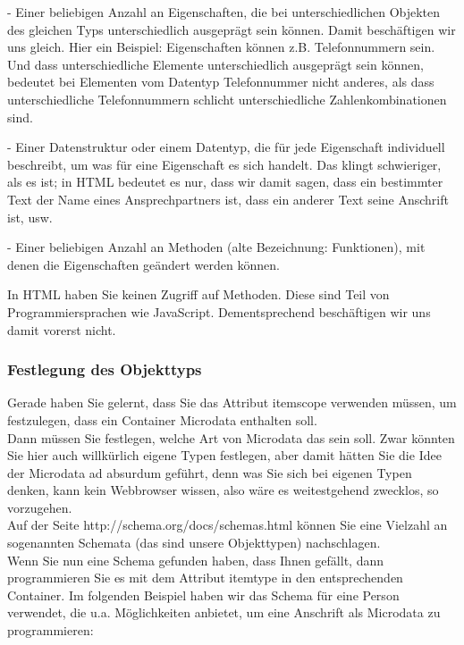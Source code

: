 -	Einer beliebigen Anzahl an Eigenschaften, die bei unterschiedlichen Objekten des gleichen Typs unterschiedlich ausgeprägt sein können.
Damit beschäftigen wir uns gleich. Hier ein Beispiel: Eigenschaften können z.B. Telefonnummern sein. Und dass unterschiedliche Elemente unterschiedlich ausgeprägt sein können, bedeutet bei Elementen vom Datentyp Telefonnummer nicht anderes, als dass unterschiedliche Telefonnummern schlicht unterschiedliche Zahlenkombinationen sind.

-	Einer Datenstruktur oder einem Datentyp, die für jede Eigenschaft individuell beschreibt, um was für eine Eigenschaft es sich handelt.
Das klingt schwieriger, als es ist; in HTML bedeutet es nur, dass wir damit sagen, dass ein bestimmter Text der Name eines Ansprechpartners ist, dass ein anderer Text seine Anschrift ist, usw.

-	Einer beliebigen Anzahl an Methoden (alte Bezeichnung: Funktionen), mit denen die Eigenschaften geändert werden können.

In HTML haben Sie keinen Zugriff auf Methoden. Diese sind Teil von Programmiersprachen wie JavaScript. Dementsprechend beschäftigen wir uns damit vorerst nicht.

\subsubsection{Festlegung des Objekttyps}

Gerade haben Sie gelernt, dass Sie das Attribut itemscope verwenden müssen, um festzulegen, dass ein Container Microdata enthalten soll.\\

Dann müssen Sie festlegen, welche Art von Microdata das sein soll. Zwar könnten Sie hier auch willkürlich eigene Typen festlegen, aber damit hätten Sie die Idee der Microdata ad absurdum geführt, denn was Sie sich bei eigenen Typen denken, kann kein Webbrowser wissen, also wäre es weitestgehend zwecklos, so vorzugehen.\\

Auf der Seite
http://schema.org/docs/schemas.html 
können Sie eine Vielzahl an sogenannten Schemata (das sind unsere Objekttypen) nachschlagen.\\

Wenn Sie nun eine Schema gefunden haben, dass Ihnen gefällt, dann programmieren Sie es mit dem Attribut itemtype in den entsprechenden Container. Im folgenden Beispiel haben wir das Schema für eine Person verwendet, die u.a. Möglichkeiten anbietet, um eine Anschrift als Microdata zu programmieren:\\

